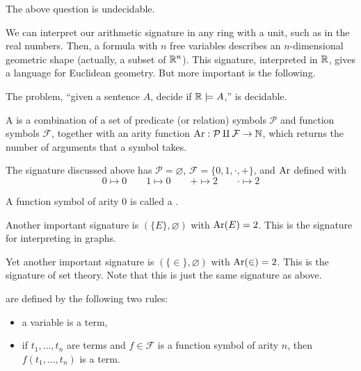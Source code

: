 \begin{theorem}
  The above question is undecidable.
\end{theorem}

We can interpret our arithmetic signature in any ring with a unit, such as in
the real numbers.
Then, a formula with $n$ free variables describes an $n$-dimensional geometric
shape (actually, a subset of $\mathbb{R}^n$).
This signature, interpreted in $\mathbb{R}$, gives a language for Euclidean geometry.
But more important is the following.

\begin{theorem}[Tarski]
  The problem, \enquote{given a sentence $A$, decide if $\mathbb{R} \models A$,}
  is decidable.
\end{theorem}

\begin{definition}
  A  is a combination of a set of predicate (or relation)
  symbols $\mathcal{P}$ and function symbols $\mathcal{F}$, together with an
  arity function $\operatorname{Ar}: \mathcal{P} \amalg \mathcal{F} \to \mathbb{N}$, which returns the
  number of arguments that a symbol takes.
\end{definition}

\begin{example}
  The signature discussed above has $\mathcal{P} = \varnothing$, $\mathcal{F} =
  \{ 0, 1, \cdot, + \}$, and $\operatorname{Ar}$ defined with
  \begin{equation*}
	0 \mapsto 0 \qquad
	1 \mapsto 0 \qquad
	+ \mapsto 2 \qquad
	\cdot \mapsto 2
  \end{equation*}
\end{example}

\begin{definition}
  A function symbol of arity $0$ is called a .
\end{definition}

\begin{example}
  Another important signature is $(\{E\}, \varnothing)$ with $\operatorname{Ar}(E) = 2$.
  This is the signature for interpreting in graphs.
\end{example}

\begin{example}
  Yet another important signature is $(\{\in\}, \varnothing)$ with
  $\operatorname{Ar}(\in) = 2$.
  This is the signature of set theory.
  Note that this is just the same signature as above.
\end{example}

\begin{definition}
   are defined by the following two rules:
  \begin{itemize}
  \item a variable is a term,
  \item if $t_1, \ldots, t_n$ are terms and $f \in \mathcal{F}$ is a function
	symbol of arity $n$, then $f(t_1, \ldots, t_n)$ is a term.
  \end{itemize}
\end{definition}

